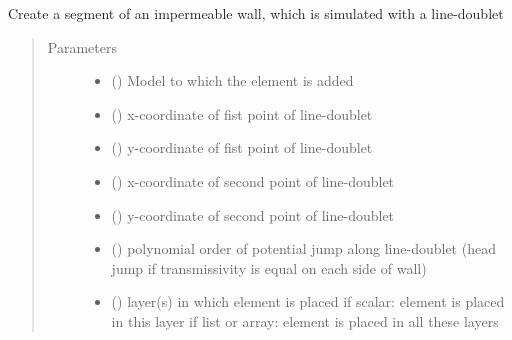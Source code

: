 \documentclass[letterpaper,10pt,english]{sphinxmanual}
\begin{document}
\begin{fulllineitems}
\label{\detokenize{linedoublets/implinedoublet:timml.linedoublet.ImpLineDoublet}}
Create a segment of an impermeable wall, which is
simulated with a line-doublet
\begin{quote}\begin{description}
\item[{Parameters}] \leavevmode\begin{itemize}
\item {} 
 () \textendash{} Model to which the element is added

\item {} 
 () \textendash{} x-coordinate of fist point of line-doublet

\item {} 
 () \textendash{} y-coordinate of fist point of line-doublet

\item {} 
 () \textendash{} x-coordinate of second point of line-doublet

\item {} 
 () \textendash{} y-coordinate of second point of line-doublet

\item {} 
 (\sphinxstyleliteralemphasis{ (}\sphinxstyleliteralemphasis{)}) \textendash{} polynomial order of potential jump along line-doublet
(head jump if transmissivity is equal on each side of wall)

\item {} 
 (\sphinxstyleliteralemphasis{, }) \textendash{} layer(s) in which element is placed
if scalar: element is placed in this layer
if list or array: element is placed in all these layers


\end{itemize}
\end{description}
\end{quote}
\end{fulllineitems}
\end{document}
